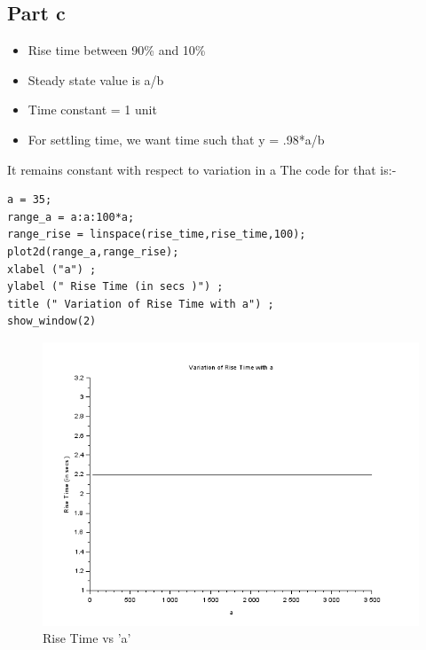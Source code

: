 \documentclass[12pt]{article}
\begin{document}
\subsection*{Part c}   
\begin{itemize}
\item Rise time between 90\% and 10\%
\item Steady state value is a/b 
\item Time constant = 1 unit
\item For settling time, we want time such that y = .98*a/b
\end{itemize}    
It remains constant with respect to variation in a
The code for that is:-
    \vspace{-2mm}
    \begin{verbatim}
a = 35;
range_a = a:a:100*a;
range_rise = linspace(rise_time,rise_time,100);
plot2d(range_a,range_rise);
xlabel ("a") ;
ylabel (" Rise Time (in secs )") ;
title (" Variation of Rise Time with a") ;
show_window(2)
    \end{verbatim}
    \vspace{-6mm}
    \begin{figure}[H]
        \centering
        \includegraphics[scale=0.8]{q1_c.png}
        \caption{Rise Time vs 'a'}
        \label{fig:my_label}
    \end{figure}
  
\end{document}
